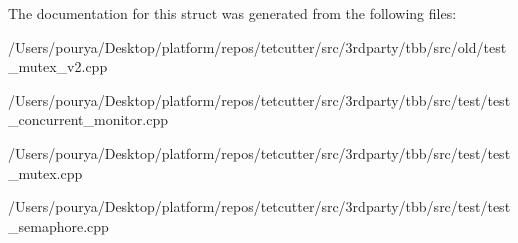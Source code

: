 The documentation for this struct was generated from the following files\+:\begin{DoxyCompactItemize}
\item 
/\+Users/pourya/\+Desktop/platform/repos/tetcutter/src/3rdparty/tbb/src/old/test\+\_\+mutex\+\_\+v2.\+cpp\item 
/\+Users/pourya/\+Desktop/platform/repos/tetcutter/src/3rdparty/tbb/src/test/test\+\_\+concurrent\+\_\+monitor.\+cpp\item 
/\+Users/pourya/\+Desktop/platform/repos/tetcutter/src/3rdparty/tbb/src/test/test\+\_\+mutex.\+cpp\item 
/\+Users/pourya/\+Desktop/platform/repos/tetcutter/src/3rdparty/tbb/src/test/test\+\_\+semaphore.\+cpp\end{DoxyCompactItemize}
